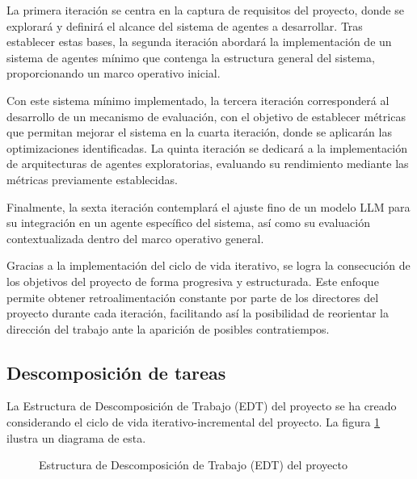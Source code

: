 La primera iteración se centra en la captura de requisitos del proyecto, donde se explorará y definirá el alcance del sistema de agentes a desarrollar. Tras establecer estas bases, la segunda iteración abordará la implementación de un sistema de agentes mínimo que contenga la estructura general del sistema, proporcionando un marco operativo inicial.

Con este sistema mínimo implementado, la tercera iteración corresponderá al desarrollo de un mecanismo de evaluación, con el objetivo de establecer métricas que permitan mejorar el sistema en la cuarta iteración, donde se aplicarán las optimizaciones identificadas. La quinta iteración se dedicará a la implementación de arquitecturas de agentes exploratorias, evaluando su rendimiento mediante las métricas previamente establecidas.

Finalmente, la sexta iteración contemplará el ajuste fino de un modelo LLM para su integración en un agente específico del sistema, así como su evaluación contextualizada dentro del marco operativo general.

Gracias a la implementación del ciclo de vida iterativo, se logra la consecución de los objetivos del proyecto de forma progresiva y estructurada. Este enfoque permite obtener retroalimentación constante por parte de los directores del proyecto durante cada iteración, facilitando así la posibilidad de reorientar la dirección del trabajo ante la aparición de posibles contratiempos.

\subsection{Descomposición de tareas}
La Estructura de Descomposición de Trabajo (EDT) del proyecto se ha creado considerando el ciclo de vida iterativo-incremental del proyecto. La figura \ref{fig:edt} ilustra un diagrama de esta. 

\begin{figure}[h]
  \centering
  \caption{Estructura de Descomposición de Trabajo (EDT) del proyecto}
  \label{fig:edt}
\end{figure}


